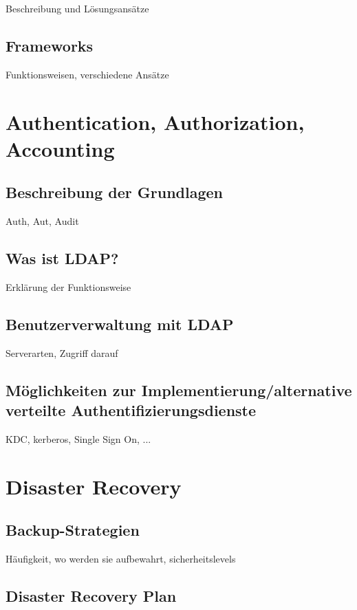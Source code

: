 \documentclass[letterpaper, 12pt]{article}
\let\tempsection\section
\renewcommand\section[1]{\vspace{-0.3cm}\tempsection{#1}\vspace{-0.3cm}}
\let\tempsubsection\subsection
\renewcommand\subsection[1]{\vspace{0cm}\tempsubsection{#1}\vspace{0cm}}
\begin{document}
Beschreibung und Lösungsansätze

\subsection{Frameworks}

Funktionsweisen, verschiedene Ansätze

\clearpage

\section{Authentication, Authorization, Accounting}

\subsection{Beschreibung der Grundlagen}

Auth, Aut, Audit

\subsection{Was ist LDAP?}
Erklärung der Funktionsweise

\subsection{Benutzerverwaltung mit LDAP}

Serverarten, Zugriff darauf

\subsection{Möglichkeiten zur Implementierung/alternative verteilte Authentifizierungsdienste}

KDC, kerberos, Single Sign On, ...

\clearpage

\section{Disaster Recovery}

\subsection{Backup-Strategien}

Häufigkeit, wo werden sie aufbewahrt, sicherheitslevels

\subsection{Disaster Recovery Plan}
\end{document}
